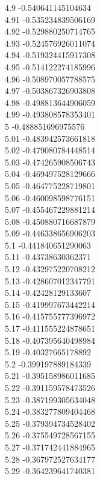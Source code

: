 {4.9	-0.540641145104634\\
4.91	-0.535234839506169\\
4.92	-0.529880250714765\\
4.93	-0.524576926011074\\
4.94	-0.519324415917308\\
4.95	-0.514122274185996\\
4.96	-0.508970057788575\\
4.97	-0.503867326903808\\
4.98	-0.498813644906059\\
4.99	-0.493808578353401\\
5	-0.488851696975576\\
5.01	-0.483942573661818\\
5.02	-0.479080784448514\\
5.03	-0.474265908506743\\
5.04	-0.469497528129666\\
5.05	-0.464775228719801\\
5.06	-0.460098598776151\\
5.07	-0.455467229881214\\
5.08	-0.450880716687879\\
5.09	-0.446338656906203\\
5.1	-0.441840651290063\\
5.11	-0.43738630362371\\
5.12	-0.432975220708212\\
5.13	-0.428607012347791\\
5.14	-0.42428129133607\\
5.15	-0.419997673442214\\
5.16	-0.415755777396972\\
5.17	-0.411555224878651\\
5.18	-0.407395640498984\\
5.19	-0.40327665178892\\
5.2	-0.399197889184339\\
5.21	-0.395158986011685\\
5.22	-0.391159578473526\\
5.23	-0.387199305634048\\
5.24	-0.383277809404468\\
5.25	-0.379394734528402\\
5.26	-0.375549728567155\\
5.27	-0.371742441884965\\
5.28	-0.367972527634177\\
5.29	-0.364239641740381\\
}
